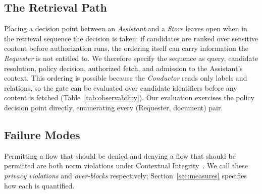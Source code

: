 \subsection{The Retrieval Path}
\label{sec:retrievalpath}
Placing a decision point between an {\em Assistant} and a {\em Store} leaves
open when in the retrieval sequence the decision is taken: if candidates are
ranked over sensitive content before authorization runs, the ordering itself
can carry information the {\em Requester} is not entitled to. We therefore
specify the sequence as query, candidate resolution, policy decision,
authorized fetch, and admission to the Assistant's context. This ordering is
possible because the {\em Conductor} reads only labels and relations, so the
gate can be evaluated over candidate identifiers before any content is fetched
(Table~\ref{tab:observability}). Our evaluation exercises the policy decision
point directly, enumerating every (Requester, document) pair.
\begin{table}[!t]
\centering
\caption{The Conductor reads labels and relations but never document content.}
\label{tab:observability}
\end{table}

\subsection{Failure Modes}
\label{sec:failuremodes}
Permitting a flow that should be denied and denying a flow that should be
permitted are both norm violations under Contextual
Integrity~\cite{nissenbaum}. We call these \textit{privacy violations} and
\textit{over-blocks} respectively; Section~\ref{sec:measures} specifies how
each is quantified.


